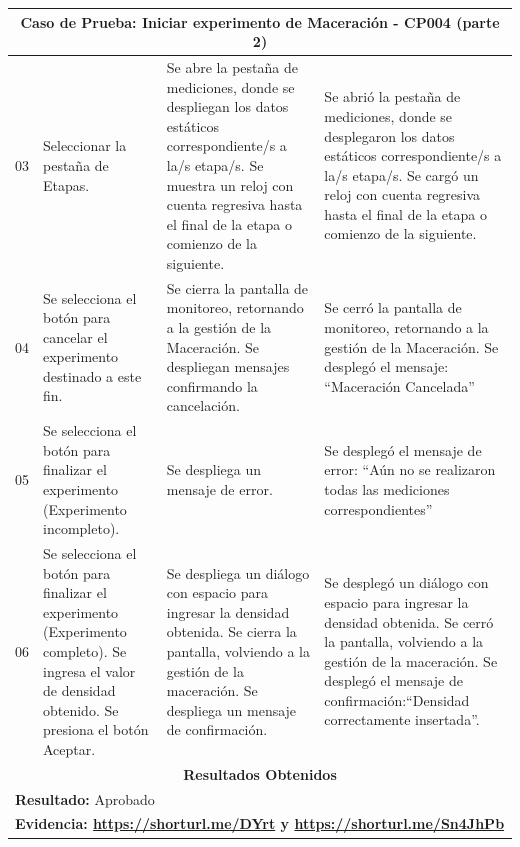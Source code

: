         \begin{minipage}{0.95\textwidth}
        \begin{center}
        \begin{tabularx}{\textwidth}{ | p{2cm} | X | X | X |}
        \hline
        \multicolumn{4}{|c|}{\textbf{Caso de Prueba: Iniciar experimento de Maceración - CP004 (parte 2)}} \\
        \hline
        03 & Seleccionar la pestaña de Etapas. & Se abre la pestaña de mediciones, donde se despliegan los datos estáticos correspondiente/s a la/s etapa/s. Se muestra un reloj con cuenta regresiva hasta el final de la etapa o comienzo de la siguiente. & Se abrió la pestaña de mediciones, donde se desplegaron los datos estáticos correspondiente/s a la/s etapa/s. Se cargó un reloj con cuenta regresiva hasta el final de la etapa o comienzo de la siguiente. \\
        \hline
        04 & Se selecciona el botón para cancelar el experimento destinado a este fin. & Se cierra la pantalla de monitoreo, retornando a la gestión de la Maceración. Se despliegan mensajes confirmando la cancelación. & Se cerró la pantalla de monitoreo, retornando a la gestión de la Maceración. Se desplegó el mensaje: ``Maceración Cancelada'' \\
        \hline
        05 & Se selecciona el botón para finalizar el experimento (Experimento incompleto). & Se despliega un mensaje de error. & Se desplegó el mensaje de error: ``Aún no se realizaron todas las mediciones correspondientes'' \\
        \hline
        06 & Se selecciona el botón para finalizar el experimento (Experimento completo). Se ingresa el valor de densidad obtenido. Se presiona el botón Aceptar. & Se despliega un diálogo con espacio para ingresar la densidad obtenida. Se cierra la pantalla, volviendo a la gestión de la maceración. Se despliega un mensaje de confirmación. & Se desplegó un diálogo con espacio para ingresar la densidad obtenida. Se cerró la pantalla, volviendo a la gestión de la maceración. Se desplegó el mensaje de confirmación:``Densidad correctamente insertada''. \\
        \hline
        
        \multicolumn{4}{|c|}{\textbf{Resultados Obtenidos}} \\
        \hline
        \multicolumn{4}{|l|}{\textbf{Resultado:} Aprobado} \\
        \hline
        \multicolumn{4}{|l|}{\textbf{Evidencia: \url{https://shorturl.me/DYrt} y \url{https://shorturl.me/Sn4JhPb} }} \\
        \hline
     \end{tabularx}
    \label{CP004-p2}
    \end{center}
    \end{minipage}
    
